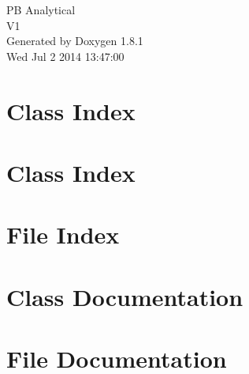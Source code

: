 \documentclass{book}
\begin{document}
\hypersetup{pageanchor=false,citecolor=blue}
\begin{titlepage}
\vspace*{7cm}
\begin{center}
{\Large P\-B Analytical \\[1ex]\large V1 }\\
\vspace*{1cm}
{\large Generated by Doxygen 1.8.1}\\
\vspace*{0.5cm}
{\small Wed Jul 2 2014 13:47:00}\\
\end{center}
\end{titlepage}
\clearemptydoublepage
{}
\tableofcontents
\clearemptydoublepage
{}
\hypersetup{pageanchor=true,citecolor=blue}
\chapter{Class Index}

\chapter{Class Index}

\chapter{File Index}

\chapter{Class Documentation}

















\chapter{File Documentation}

























\printindex
\end{document}
